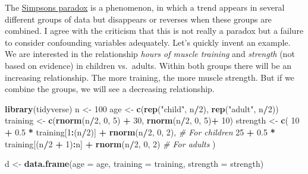 \documentclass[
]{book}
\newenvironment{Shaded}{\begin{snugshade}}{\end{snugshade}}
\newcommand{\AttributeTok}[1]{\textcolor[rgb]{0.13,0.29,0.53}{#1}}
\newcommand{\CommentTok}[1]{\textcolor[rgb]{0.56,0.35,0.01}{\textit{#1}}}
\newcommand{\DecValTok}[1]{\textcolor[rgb]{0.00,0.00,0.81}{#1}}
\newcommand{\FloatTok}[1]{\textcolor[rgb]{0.00,0.00,0.81}{#1}}
\newcommand{\FunctionTok}[1]{\textcolor[rgb]{0.13,0.29,0.53}{\textbf{#1}}}
\newcommand{\NormalTok}[1]{#1}
\newcommand{\OtherTok}[1]{\textcolor[rgb]{0.56,0.35,0.01}{#1}}
\newcommand{\SpecialCharTok}[1]{\textcolor[rgb]{0.81,0.36,0.00}{\textbf{#1}}}
\newcommand{\StringTok}[1]{\textcolor[rgb]{0.31,0.60,0.02}{#1}}
\begin{document}
The \href{https://en.wikipedia.org/wiki/Simpson\%27s_paradox}{Simpsons paradox} is a phenomenon,
in which a trend appears in several different groups of data but disappears
or reverses when these groups are combined. I agree with the criticism that this is not really
a paradox but a failure to consider confounding variables adequately. Let's quickly invent an example.
We are interested in the relationship \emph{hours of muscle training} and \emph{strength} (not based on evidence)
in children vs.~adults. Within both groups there will be an increasing relationship. The more training,
the more muscle strength. But if we combine the groups, we will see a decreasing relationship.

\begin{Shaded}
\begin{Highlighting}[]
\FunctionTok{library}\NormalTok{(tidyverse)}
\NormalTok{n }\OtherTok{\textless{}{-}} \DecValTok{100}
\NormalTok{age }\OtherTok{\textless{}{-}} \FunctionTok{c}\NormalTok{(}\FunctionTok{rep}\NormalTok{(}\StringTok{"child"}\NormalTok{, n}\SpecialCharTok{/}\DecValTok{2}\NormalTok{), }\FunctionTok{rep}\NormalTok{(}\StringTok{"adult"}\NormalTok{, n}\SpecialCharTok{/}\DecValTok{2}\NormalTok{))}
\NormalTok{training }\OtherTok{\textless{}{-}} \FunctionTok{c}\NormalTok{(}\FunctionTok{rnorm}\NormalTok{(n}\SpecialCharTok{/}\DecValTok{2}\NormalTok{, }\DecValTok{0}\NormalTok{, }\DecValTok{5}\NormalTok{) }\SpecialCharTok{+} \DecValTok{30}\NormalTok{, }\FunctionTok{rnorm}\NormalTok{(n}\SpecialCharTok{/}\DecValTok{2}\NormalTok{, }\DecValTok{0}\NormalTok{, }\DecValTok{5}\NormalTok{)}\SpecialCharTok{+} \DecValTok{10}\NormalTok{)}
\NormalTok{strength }\OtherTok{\textless{}{-}} \FunctionTok{c}\NormalTok{(}
  \DecValTok{10} \SpecialCharTok{+} \FloatTok{0.5} \SpecialCharTok{*}\NormalTok{ training[}\DecValTok{1}\SpecialCharTok{:}\NormalTok{(n}\SpecialCharTok{/}\DecValTok{2}\NormalTok{)] }\SpecialCharTok{+} \FunctionTok{rnorm}\NormalTok{(n}\SpecialCharTok{/}\DecValTok{2}\NormalTok{, }\DecValTok{0}\NormalTok{, }\DecValTok{2}\NormalTok{), }\CommentTok{\# For children}
  \DecValTok{25} \SpecialCharTok{+} \FloatTok{0.5} \SpecialCharTok{*}\NormalTok{ training[(n}\SpecialCharTok{/}\DecValTok{2} \SpecialCharTok{+} \DecValTok{1}\NormalTok{)}\SpecialCharTok{:}\NormalTok{n] }\SpecialCharTok{+} \FunctionTok{rnorm}\NormalTok{(n}\SpecialCharTok{/}\DecValTok{2}\NormalTok{, }\DecValTok{0}\NormalTok{, }\DecValTok{2}\NormalTok{) }\CommentTok{\# For adults}
\NormalTok{)}

\NormalTok{d }\OtherTok{\textless{}{-}} \FunctionTok{data.frame}\NormalTok{(}\AttributeTok{age =}\NormalTok{ age, }\AttributeTok{training =}\NormalTok{ training, }\AttributeTok{strength =}\NormalTok{ strength)}


\end{Highlighting}
\end{Shaded}
\end{document}
